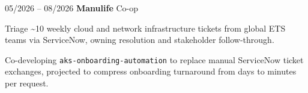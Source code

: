 \begin{twocolentry}{05/2026 – 08/2026} \textbf{Manulife}
\newline Co-op \end{twocolentry}
\begin{onecolentry}
\begin{highlights}
\item Triage \textasciitilde10 weekly cloud and network infrastructure tickets from global ETS teams via ServiceNow, owning resolution and stakeholder follow-through.
\item Co-developing \texttt{aks-onboarding-automation} to replace manual ServiceNow ticket exchanges, projected to compress onboarding turnaround from days to minutes per request.
\end{highlights}
\end{onecolentry}